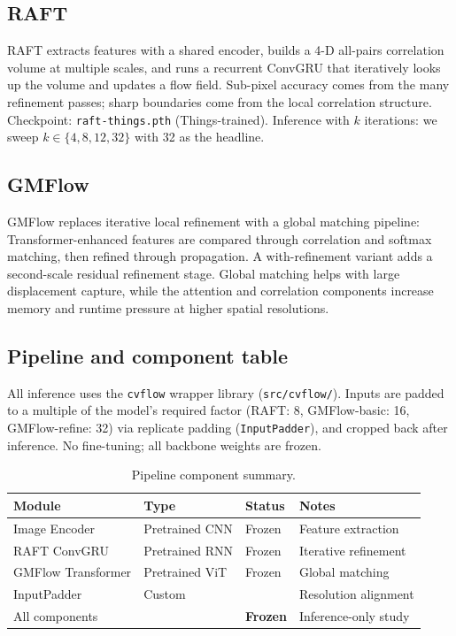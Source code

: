\documentclass[11pt,a4paper]{article}
\begin{document}
\subsection{RAFT}
RAFT \cite{teed2020raft} extracts features with a shared encoder, builds
a 4-D all-pairs correlation volume at multiple scales, and runs a
recurrent ConvGRU that iteratively looks up the volume and updates a
flow field.  Sub-pixel accuracy comes from the many refinement passes;
sharp boundaries come from the local correlation structure.
Checkpoint: \texttt{raft-things.pth} (Things-trained).
Inference with $k$ iterations: we sweep $k\in\{4,8,12,32\}$ with 32 as
the headline.

\subsection{GMFlow}
GMFlow \cite{xu2022gmflow} replaces iterative local refinement with a
global matching pipeline: Transformer-enhanced features are compared
through correlation and softmax matching, then refined through propagation.
A with-refinement variant adds a second-scale residual refinement stage.
Global matching helps with large displacement capture, while the attention
and correlation components increase memory and runtime pressure at higher
spatial resolutions.


\subsection{Pipeline and component table}
All inference uses the \texttt{cvflow} wrapper library
(\texttt{src/cvflow/}).  Inputs are padded to a multiple of the
model's required factor (RAFT: 8, GMFlow-basic: 16, GMFlow-refine: 32)
via replicate padding (\texttt{InputPadder}), and cropped back after
inference.  No fine-tuning; all backbone weights are frozen.

\begin{table}[htbp]
\centering
\caption{Pipeline component summary.}
\label{tab:components}
\setlength{\tabcolsep}{5pt}
\small
\begin{tabular}{llll}
\toprule
Module & Type & Status & Notes \\
\midrule
Image Encoder & Pretrained CNN & Frozen & Feature extraction \\
RAFT ConvGRU & Pretrained RNN & Frozen & Iterative refinement \\
GMFlow Transformer & Pretrained ViT & Frozen & Global matching \\
InputPadder & Custom &  & Resolution alignment \\
\midrule
All components &  & \textbf{Frozen} & Inference-only study \\
\bottomrule
\end{tabular}
\end{table}
\end{document}
